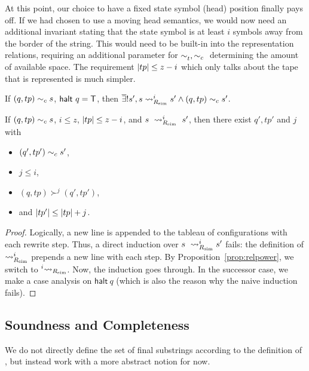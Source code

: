 \begin{remark}
  At this point, our choice to have a fixed state symbol (head) position finally pays off. If we had chosen to use a moving head semantics, we would now need an additional invariant stating that the state symbol is at least $i$ symbols away from the border of the string. This would need to be built-in into the representation relations, requiring an additional parameter for $\sim_t^{}, \sim_c{}$ determining the amount of available space.
  The requirement $|tp| \le z - i$ which only talks about the tape that is represented is much simpler.
\end{remark}

\begin{lemma}\label{lem:multistep_halt}
  If $(q, tp) \sim_c{} s$, $\textsf{halt}~q = \mathsf{T}$, then $\overline{\exists}! s', s \rightsquigarrow_{R_{\text{sim}}}^i s' \land (q, tp) \sim_c{} s'$. 
\end{lemma}

\begin{lemma}\label{lem:multistep_sound}
  If $(q, tp) \sim_c{} s$, $i \le z$, $|tp| \le z - i$, and $s~\rightsquigarrow_{R_{\text{sim}}}^i~s'$, then there exist $q', tp'$ and $j$ with 
  \begin{itemize}
    \item $(q', tp') \sim_c{} s'$, 
    \item $j \le i$, 
    \item $(q, tp) \succ^j (q', tp')$, 
    \item and $|tp'| \le |tp| + j$.
  \end{itemize}
\end{lemma}
\begin{proof}
  Logically, a new line is appended to the tableau of configurations with each rewrite step. Thus, a direct induction over $s~\rightsquigarrow_{R_{\text{sim}}}^i s'$ fails: the definition of $\rightsquigarrow_{R_{\text{sim}}}^i$ prepends a new line with each step. By Proposition~\ref{prop:relpower}, we switch to $\prescript{i}{}{\rightsquigarrow_{\ensuremath{R_{\text{sim}}}}}$. 
  Now, the induction goes through. In the successor case, we make a case analysis on $\textsf{halt}~q$ (which is also the reason why the naive induction fails).
\end{proof}

\subsection{Soundness and Completeness}
We do not directly define the set of final substrings according to the definition of \PR{}, but instead work with a more abstract notion for now.

